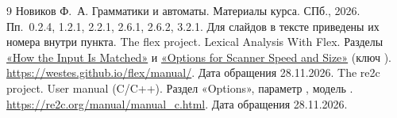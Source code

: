 \begingroup\small
\renewcommand{\refname}{Источники}
\begin{thebibliography}{9}\setlength{\itemsep}{2pt}\setlength{\parskip}{0pt}
 Новиков Ф.~А. Грамматики и автоматы. Материалы курса. СПб., 2026. Пп.~0.2.4, 1.2.1, 2.2.1, 2.6.1, 2.6.2, 3.2.1. Для слайдов в тексте приведены их номера внутри пункта.
 The flex project. Lexical Analysis With Flex. Разделы \href{https://westes.github.io/flex/manual/Matching.html}{«How the Input Is Matched»} и \href{https://westes.github.io/flex/manual/Options-for-Scanner-Speed-and-Size.html}{«Options for Scanner Speed and Size»} (ключ ). \url{https://westes.github.io/flex/manual/}. Дата обращения 28.11.2026.
 The re2c project. User manual (C/C++). Раздел «Options», параметр , модель . \url{https://re2c.org/manual/manual_c.html}. Дата обращения 28.11.2026.
\end{thebibliography}
\endgroup
